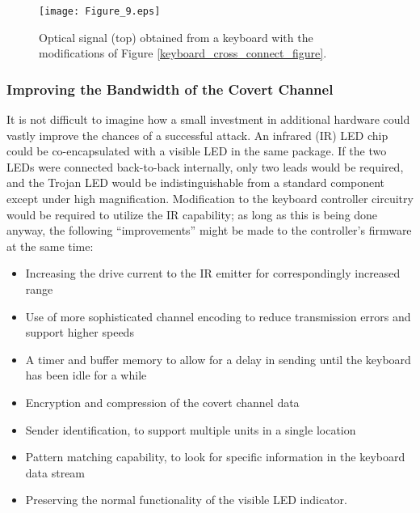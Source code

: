 \documentclass{acmtrans2e}
\begin{document}
\begin{figure}
\centering
\texttt{[image: Figure\_9.eps]}
\caption{Optical signal (top) obtained from a keyboard with the 
modifications of Figure \ref{keyboard_cross_connect_figure}.}
\label{keyboard_intercept_figure}
\end{figure}

\subsubsection{Improving the Bandwidth of the Covert Channel}

It is not difficult to imagine how a small investment in additional 
hardware could vastly improve the chances of a successful attack.  An 
infrared (IR) LED chip could be co-encapsulated with a visible LED in 
the same package.  If the two LEDs were connected back-to-back 
internally, only two leads would be required, and the Trojan LED would 
be indistinguishable from a standard component except under high 
magnification.  Modification to the keyboard controller circuitry would 
be required to utilize the IR capability; as long as this is being done 
anyway, the following ``improvements'' might be made to the controller's 
firmware at the same time:

\begin{itemize}

\item Increasing the drive current to the IR emitter for correspondingly 
increased range

\item Use of more sophisticated channel encoding to reduce transmission 
errors and support higher speeds

\item A timer and buffer memory to allow for a delay in sending until 
the keyboard has been idle for a while

\item Encryption and compression of the covert channel data

\item Sender identification, to support multiple units in a single location

\item Pattern matching capability, to look for specific information in 
the keyboard data stream

\item Preserving the normal functionality of the visible LED indicator.

\end{itemize}
\end{document}
